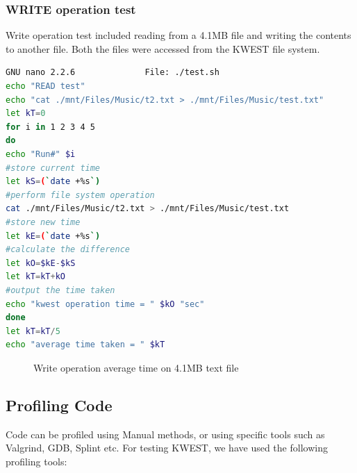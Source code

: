 \subsubsection{WRITE operation test}
Write operation test included reading from a 4.1MB file and writing the contents to another file. Both the files were accessed from the KWEST file system.
\begin{lstlisting}[language=bash,frame=single]
GNU nano 2.2.6              File: ./test.sh        
echo "READ test"
echo "cat ./mnt/Files/Music/t2.txt > ./mnt/Files/Music/test.txt"
let kT=0
for i in 1 2 3 4 5 
do
echo "Run#" $i
#store current time
let kS=(`date +%s`)
#perform file system operation
cat ./mnt/Files/Music/t2.txt > ./mnt/Files/Music/test.txt
#store new time
let kE=(`date +%s`)
#calculate the difference
let kO=$kE-$kS
let kT=kT+kO
#output the time taken
echo "kwest operation time = " $kO "sec"
done
let kT=kT/5
echo "average time taken = " $kT
\end{lstlisting}
\begin{figure}[htb]
\centering
\setlength\fboxsep{0pt}
\setlength\fboxrule{0.5pt}
\caption{Write operation average time on 4.1MB text file}
\label{fig:dfd0}
\end{figure}


\subsection{Profiling Code}
Code can be profiled using Manual methods, or using specific tools such as Valgrind, GDB, Splint etc. For testing KWEST, we have used the following profiling tools:
